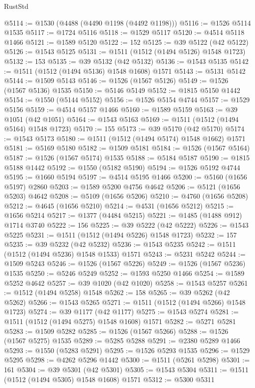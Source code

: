 \begin{lexlean}{RustStd}
\begin{coremodule}
{\begin{coremodule}
{{{{{{{{{{{{{{{{{{{{{{{{{{{{{{{{{{{@5114 := @1530 (@4488 (@4490 @1198 (@4492 @1198)))
@5116 := @1526 @5114 @1535
@5117 := @1724 @5116
@5118 := @1529 @5117
@5120 := @4514 @5118 @1466
@5121 := @1589 @5120
@5122 := 152
@5125 := @39 @5122 (@42 @5122)
@5126 := @1543 @5125
@5131 := @1511 (@1512 (@1494 @5126) @1548 @1723)
@5132 := 153
@5135 := @39 @5132 (@42 @5132)
@5136 := @1543 @5135
@5142 := @1511 (@1512 (@1494 @5136) @1548 @1608) @1571
@5143 := @5131 @5142
@5144 := @1509 @5143
@5146 := @1526 (@1567 @5126)
@5149 := @1526 (@1567 @5136) @1535
@5150 := @5146 @5149
@5152 := @1815 @5150 @1442
@5154 := @1550 (@5144 @5152)
@5156 := @1526 @5154 @4744
@5157 := @1529 @5156
@5159 := @4514 @5157 @1466
@5160 := @1589 @5159
@5163 := @39 @1051 (@42 @1051)
@5164 := @1543 @5163
@5169 := @1511 (@1512 (@1494 @5164) @1548 @1723)
@5170 := 155
@5173 := @39 @5170 (@42 @5170)
@5174 := @1543 @5173
@5180 := @1511 (@1512 (@1494 @5174) @1548 @1662) @1571
@5181 := @5169 @5180
@5182 := @1509 @5181
@5184 := @1526 (@1567 @5164)
@5187 := @1526 (@1567 @5174) @1535
@5188 := @5184 @5187
@5190 := @1815 @5188 @1442
@5192 := @1550 (@5182 @5190)
@5194 := @1526 @5192 @4744
@5195 := @1660 @5194
@5197 := @4514 @5195 @1466
@5200 := @5160 (@1656 @5197) @2860
@5203 := @1589 @5200 @4756 @4642
@5206 := @5121 (@1656 @5203) @4642
@5208 := @5109 (@1656 @5206)
@5210 := @4760 (@1656 @5208)
@5212 := @4645 (@1656 @5210)
@5214 := @4531 (@1656 @5212)
@5215 := @1656 @5214
@5217 := @1377 (@4484 @5215)
@5221 := @1485 (@1488 @912) @1714 @3740
@5222 := 156
@5225 := @39 @5222 (@42 @5222)
@5226 := @1543 @5225
@5231 := @1511 (@1512 (@1494 @5226) @1548 @1723)
@5232 := 157
@5235 := @39 @5232 (@42 @5232)
@5236 := @1543 @5235
@5242 := @1511 (@1512 (@1494 @5236) @1548 @1533) @1571
@5243 := @5231 @5242
@5244 := @1509 @5243
@5246 := @1526 (@1567 @5226)
@5249 := @1526 (@1567 @5236) @1535
@5250 := @5246 @5249
@5252 := @1593 @5250 @1466
@5254 := @1589 @5252 @4642
@5257 := @39 @1020 (@42 @1020)
@5258 := @1543 @5257
@5261 := @1512 (@1494 @5258) @1548
@5262 := 158
@5265 := @39 @5262 (@42 @5262)
@5266 := @1543 @5265
@5271 := @1511 (@1512 (@1494 @5266) @1548 @1723)
@5274 := @39 @1177 (@42 @1177)
@5275 := @1543 @5274
@5281 := @1511 (@1512 (@1494 @5275) @1548 @1608) @1571
@5282 := @5271 @5281
@5283 := @1509 @5282
@5285 := @1526 (@1567 @5266)
@5288 := @1526 (@1567 @5275) @1535
@5289 := @5285 @5288
@5291 := @2380 @5289 @1466
@5293 := @1550 (@5283 @5291)
@5295 := @1526 @5293 @1535
@5296 := @1529 @5295
@5298 := @4262 @5296 @1442
@5300 := @1511 (@5261 @5298)
@5301 := 161
@5304 := @39 @5301 (@42 @5301)
@5305 := @1543 @5304
@5311 := @1511 (@1512 (@1494 @5305) @1548 @1608) @1571
@5312 := @5300 @5311
}}}}}}}}}}}}}}}}}}}}}}}}}}}}}}}}}}}
\end{coremodule}}
\end{coremodule}
\end{lexlean}
